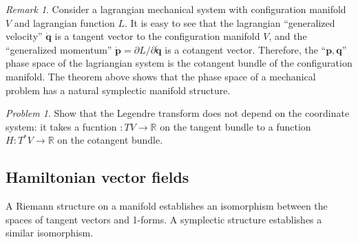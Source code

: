 \documentclass[leqno]{report}
\numberwithin{equation}{section}
\theoremstyle{plain}
\theoremstyle{definition}
\theoremstyle{remark}
\newtheorem*{rem*}{Remark}
\theoremstyle{smallcap}
\newtheorem*{prob*}{Problem}
\numberwithin{prob}{section}
\begin{document}
\begin{rem*}
Consider a lagrangian mechanical system with configuration manifold $V$
and lagrangian function $L$.
It is easy to see that the lagrangian ``generalized velocity''
$\dot{\mathbf q}$ is a tangent vector to the configuration manifold $V$,
and the ``generalized momentum''
$\dot{\mathbf p} = \partial L/\partial \dot{\mathbf q}$
is a cotangent vector.
Therefore, the ``$\mathbf p, \mathbf q$'' phase space of the lagriangian
system is the cotangent bundle of the configuration manifold.
The theorem above shows that the phase space of a mechanical problem
has a natural symplectic manifold structure.
\end{rem*}

\begin{prob*}
  Show that the Legendre transform does not depend on the coordinate system:
  it takes a fucntion $:TV \to \mathbb R$ on the tangent bundle
  to a function $H: T^*V \to \mathbb R$ on the cotangent bundle.


\end{prob*}

\subsection{Hamiltonian vector fields}



A Riemann structure on a manifold establishes an isomorphism between
the spaces of tangent vectors and 1-forms.
%
A symplectic structure establishes a similar isomorphism.
\end{document}
